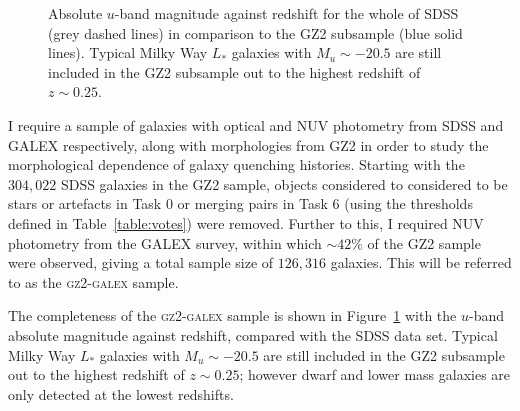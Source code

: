 \begin{figure}[t]
\caption[GZ2-GALEX sample completeness]{Absolute $u$-band magnitude against redshift for the whole of SDSS (grey dashed lines) in comparison to the GZ2 subsample (blue solid lines). Typical Milky Way $L_*$ galaxies with $M_u \sim -20.5$ are still included in the GZ2 subsample out to the highest redshift of $z \sim 0.25$.}
\label{complete}
\end{figure}


I require a sample of galaxies with optical and NUV photometry from SDSS and GALEX respectively, along with morphologies from GZ2 in order to study the morphological dependence of galaxy quenching histories. Starting with the $304,022$ SDSS galaxies in the GZ2 sample, objects considered to considered to be stars or artefacts in Task 0 or merging pairs in Task 6 (using the thresholds defined in Table~\ref{table:votes}) were removed. Further to this, I required NUV photometry from the GALEX survey, within which $\sim42\%$ of the GZ2 sample were observed, giving a total sample size of $126, 316$ galaxies. This will be referred to as the \textsc{gz2-galex} sample. 

The completeness of the \textsc{gz2-galex} sample is shown in Figure~\ref{complete} with the $u$-band absolute magnitude against redshift, compared with the SDSS data set. Typical Milky Way $L_*$ galaxies with $M_u \sim -20.5$ are still included in the GZ2 subsample out to the highest redshift of $z \sim 0.25$; however dwarf and lower mass galaxies are only detected at the lowest redshifts.

